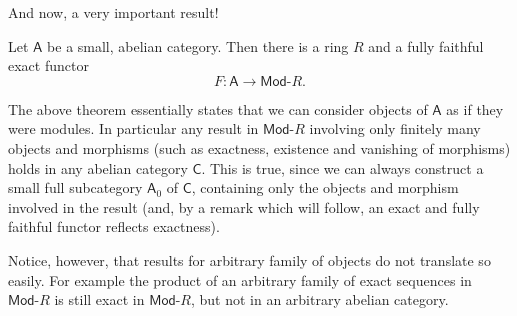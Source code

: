 And now, a very important result!
\begin{thm}
	Let $\mathsf{A}$ be a small, abelian category.
	Then there is a ring $R$ and a fully faithful exact functor
	\begin{equation}
	F\colon \mathsf{A} \to \mathsf{Mod}\text{-}R
	.\end{equation} 
\end{thm}

\begin{rem}[]
	The above theorem essentially states that we can consider objects of $\mathsf{A}$ as if they were modules.
	In particular any result in $\mathsf{Mod}\text{-}R$ involving only finitely many
	objects and morphisms (such as exactness, existence and vanishing of morphisms)
	holds in any abelian category $\mathsf{C}$.
	This is true, since we can always construct a small full subcategory $\mathsf{A}_0$ of $\mathsf{C}$,
	containing only the objects and morphism involved in the result (and, by a remark which will follow,
	an exact and fully faithful functor reflects exactness).

	Notice, however, that results for arbitrary family of objects do not translate so easily.
	For example the product of an arbitrary family of exact sequences in $\mathsf{Mod}\text{-}R$
	is still exact in $\mathsf{Mod}\text{-}R$, 
	but not in an arbitrary abelian category.
\end{rem}

